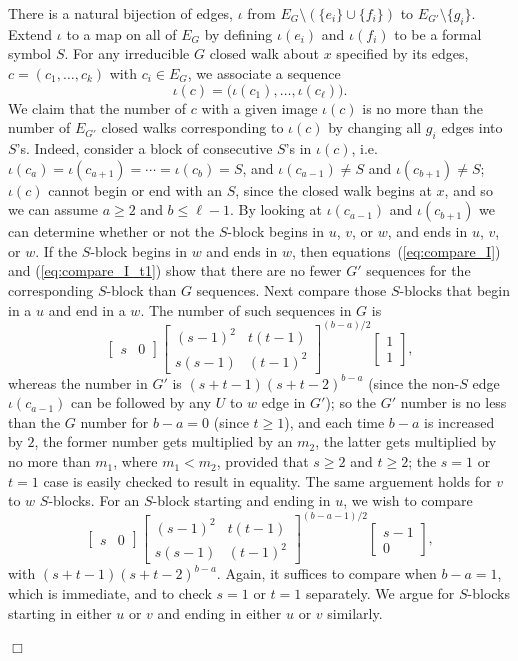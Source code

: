 \documentclass[12pt]{article}
\newcommand{\proofbox}{\begin{flushright}$\Box$\end{flushright}}
\begin{document}
There is a natural bijection of edges, $\iota$ from $E_{G}
\setminus(\{e_i\}\cup\{f_i\})$ to $E_{G'}\setminus\{g_i\}$.
Extend $\iota$ to a map on all of $E_G$ by defining $\iota(e_i)$ and
$\iota(f_i)$ to be a formal symbol $S$.  For any irreducible $G$ closed walk
about $x$ specified by its edges,
$c=(c_1,\ldots, c_k)$ with $c_i\in E_G$, we associate a sequence
$$
\iota(c) = \bigl( \iota(c_1),\ldots,\iota(c_\ell) \bigr).
$$
We claim that the number of $c$ with a given image $\iota(c)$ is no 
more than the number of $E_{G'}$ closed walks corresponding to $\iota(c)$
by changing all $g_i$ edges into $S$'s.  
Indeed, consider a block of consecutive $S$'s in $\iota(c)$, i.e.
$\iota(c_a)=\iota(c_{a+1})=\cdots=\iota(c_b)=S$, and $\iota(c_{a-1})\ne S$
and $\iota(c_{b+1})\ne S$;  $\iota(c)$ cannot begin or end with an $S$,
since the closed walk begins at $x$, and so we can assume $a\ge 2$ and $b\le \ell-1$.
By looking at $\iota(c_{a-1})$ and $\iota(c_{b+1})$ we can determine
whether or not the $S$-block begins in $u$, $v$, or $w$, and ends
in $u$, $v$, or $w$.  If the $S$-block begins in $w$ and ends in $w$, then
equations~(\ref{eq:compare_I}) and (\ref{eq:compare_I_t1})
show that there are no fewer $G'$ sequences
for the corresponding $S$-block than $G$ sequences.  Next compare those
$S$-blocks
that begin in a $u$ and end in a $w$.  The number of such sequences
in $G$ is
$$
\left[ \begin{array}{cc}s&0\end{array}\right]
\left[ \begin{array}{cc}(s-1)^2&t(t-1)\\s(s-1)&(t-1)^2\end{array}\right]^{(b-a)/2}
\left[ \begin{array}{c}1\\1\end{array}\right],
$$
whereas the number in $G'$ is $(s+t-1)(s+t-2)^{b-a}$ (since the non-$S$
edge $\iota(c_{a-1})$ can be followed by any $U$ to $w$ edge in $G'$);
so the $G'$ number is no less than the $G$ number for $b-a=0$ (since $t\ge 1$),
and each time $b-a$ is increased by $2$, the former number
gets multiplied by an
$m_2$, the latter gets multiplied by no more than $m_1$, where $m_1<m_2$,
provided that $s\ge 2$ and $t\ge 2$; the $s=1$ or $t=1$ case is easily
checked to result in equality.
The same arguement holds for $v$ to $w$ $S$-blocks.  For an $S$-block starting
and ending in $u$, we wish to compare
$$
\left[ \begin{array}{cc}s&0\end{array}\right]
\left[ \begin{array}{cc}(s-1)^2&t(t-1)\\s(s-1)&(t-1)^2\end{array}\right]^{(b-a-1)/2}
\left[ \begin{array}{c}s-1\\0\end{array}\right],
$$
with $(s+t-1)(s+t-2)^{b-a}$.
Again, it suffices to compare when $b-a=1$, which is immediate, and to check
$s=1$ or $t=1$ separately.
We argue for $S$-blocks starting in either $u$ or $v$ and ending in either
$u$ or $v$ similarly.
\proofbox
\end{document}
